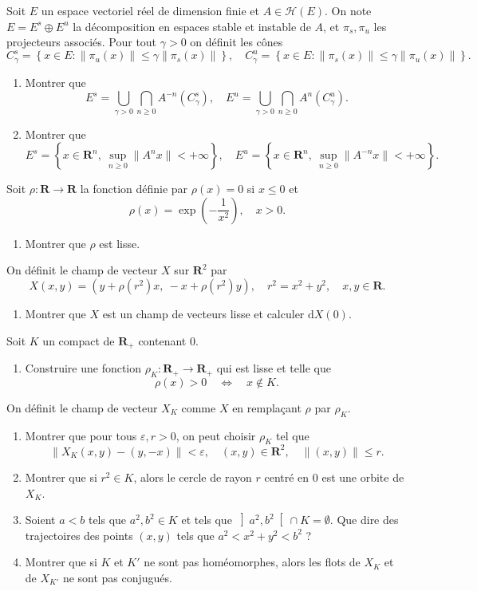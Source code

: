 \documentclass[a4paper,10pt,openany]{article}
\theoremstyle{plain}
\theoremstyle{definition}
\newcommand{\dd}{\mathrm{d}}
\newcommand{\R}{\mathbf{R}}
\begin{document}
\noindent Soit $E$ un espace vectoriel r\'eel de dimension finie et $A \in \mathcal{H}(E)$. On note $E = E^s \oplus E^u$ la d\'ecomposition en espaces stable et instable de $A$, et $\pi_s, \pi_u$ les projecteurs associ\'es. Pour tout $\gamma > 0$ on d\'efinit les c\^ones
$$
C_{\gamma}^{s}=\left\{x \in E:\left\|\pi_{u}(x)\right\| \leq \gamma\left\|\pi_{s}(x)\right\|\right\}, \quad C_{\gamma}^{u}=\left\{x \in E:\left\|\pi_{s}(x)\right\| \leq \gamma\left\|\pi_{u}(x)\right\|\right\}.
$$
\begin{enumerate}
\item Montrer que 
$$
E^s = \bigcup_{\gamma > 0} \bigcap_{n \geq 0} A^{-n}(C^s_\gamma), \quad E^u = \bigcup_{\gamma > 0} \bigcap_{n \geq 0} A^{n}(C^u_\gamma).
$$
\item Montrer que 
$$
E^s = \left\{x \in \R^n,~\sup_{n \geqslant 0} \|A^nx\| < +\infty \right\}, \quad E^u = \left\{x \in \R^n,~ \sup_{n \geqslant 0} \|A^{-n}x\| < +\infty\right\}.
$$
\end{enumerate}
\vspace{0.6cm}

 \vspace{1.5mm} 

\noindent Soit $\rho : \R \to \R$ la fonction d\'efinie par $\rho(x) = 0$ si $x \leq 0$ et 
$$
\rho(x) = \exp\left(-\frac{1}{x^2}\right), \quad x > 0.
$$

\begin{enumerate}
\item Montrer que $\rho$ est lisse.
\end{enumerate}
On d\'efinit le champ de vecteur $X$ sur $\R^2$ par 
$$
X(x,y) = \left(y + \rho(r^2)x,~-x + \rho(r^2)y\right), \quad r^2 = x^2 + y^2, \quad x,y \in \R.
$$
\begin{enumerate}[resume]
\item Montrer que $X$ est un champ de vecteurs lisse et calculer $\dd X(0).$
\end{enumerate}
Soit $K$ un compact de $\R_+$ contenant $0$.
\begin{enumerate}[resume]
\item Construire une fonction $\rho_K : \R_+ \to \R_+$ qui est lisse et telle que 
$$\rho(x) > 0 \quad \iff \quad x \notin K.$$
\end{enumerate}
On d\'efinit le champ de vecteur $X_K$ comme $X$ en rempla\c cant $\rho$ par $\rho_K$.
\begin{enumerate}[resume]
\item Montrer que pour tous $\varepsilon, r > 0$, on peut choisir $\rho_K$ tel que
$$
\|X_K(x,y) - (y,-x)\|< \varepsilon, \quad (x,y) \in \R^2, \quad \|(x,y)\|\leq r.
$$
\item Montrer que si $r^2 \in K$, alors le cercle de rayon $r$ centr\'e en $0$ est une orbite de $X_K$.
\item Soient $a<b$ tels que $a^2, b^2 \in K$ et tels que $\left]a^2, b^2\right[ \cap K = \emptyset.$ Que dire des trajectoires des points $(x,y)$ tels que $a^2 < x^2 + y^2 < b^2$ ?
\item Montrer que si $K$ et $K'$ ne sont pas hom\'eomorphes, alors les flots de $X_K$ et de $X_{K'}$ ne sont pas conjugu\'es.
\end{enumerate}
\end{document}

